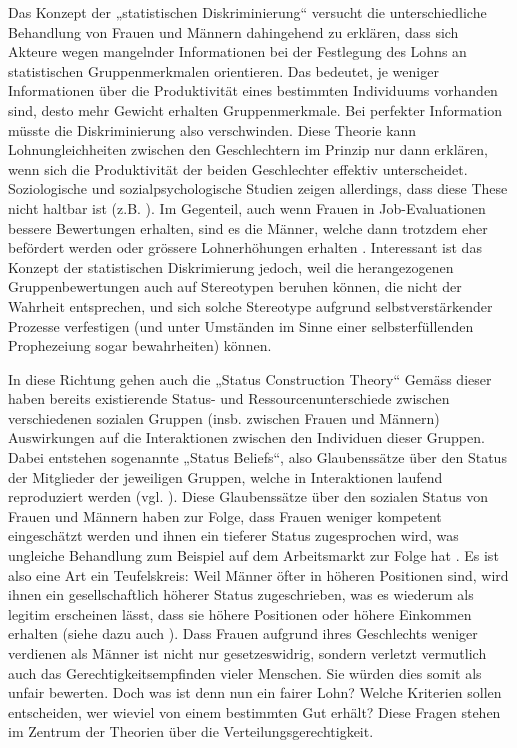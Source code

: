 \documentclass[a4paper,12pt]{article}
\renewcommand{\baselinestretch}{1.1}
\newif\ifcomments
\newcommand{\comment}[1]{%
    \ifcomments\marginpar{\renewcommand{\baselinestretch}{1}\tiny\hspace*{-1.1em}\colorbox{gray!20}%
    {\textcolor{red}{\parbox[t]{.9in}{\raggedright #1}}}}\fi}
\begin{document}
Das Konzept der „statistischen Diskriminierung“ \citep{Arrow-1972,Phelps-1972} versucht
die unterschiedliche Behandlung von Frauen und Männern dahingehend zu erklären,
dass sich Akteure wegen mangelnder Informationen bei der Festlegung des Lohns
an statistischen Gruppenmerkmalen orientieren. Das bedeutet, je weniger Informationen über die Produktivität eines bestimmten Individuums vorhanden sind, desto mehr Gewicht erhalten Gruppenmerkmale. Bei perfekter Information müsste die Diskriminierung also verschwinden. Diese Theorie kann
Lohnungleichheiten zwischen den Geschlechtern im Prinzip nur dann erklären, wenn
sich die Produktivität der beiden Geschlechter effektiv unterscheidet. Soziologische und
sozialpsychologische Studien zeigen allerdings, dass diese These nicht haltbar
ist (z.B. \citealp{Bielby-Bielby-1988}). Im Gegenteil, auch wenn Frauen in
Job-Evaluationen bessere Bewertungen erhalten, sind es die Männer, welche dann
trotzdem eher befördert werden \citep{Blau-DeVaro-2007} oder grössere
Lohnerhöhungen erhalten \citep{Castilla-2012}. Interessant ist das Konzept der 
statistischen Diskrimierung jedoch, weil die herangezogenen Gruppenbewertungen auch auf 
Stereotypen beruhen können, die nicht der Wahrheit 
entsprechen, und sich solche Stereotype aufgrund selbstverstärkender Prozesse 
verfestigen (und unter Umständen im Sinne einer selbsterfüllenden Prophezeiung 
sogar bewahrheiten) können.

In diese Richtung gehen auch die „Status Construction Theory“ \citep{Ridgeway-1997,Ridgeway-2001} Gemäss dieser haben bereits existierende Status- und Ressourcenunterschiede zwischen verschiedenen sozialen Gruppen (insb. zwischen
Frauen und Männern) Auswirkungen auf die Interaktionen zwischen den Individuen
dieser Gruppen. Dabei entstehen sogenannte „Status Beliefs“, also Glaubenssätze
über den Status der Mitglieder der jeweiligen Gruppen, welche in Interaktionen
laufend reproduziert werden (vgl. \citealp{Goffman-1977}). Diese Glaubenssätze
über den sozialen Status von Frauen und Männern haben zur Folge, dass Frauen
weniger kompetent eingeschätzt werden und ihnen ein tieferer Status
zugesprochen wird, was ungleiche Behandlung zum Beispiel auf dem Arbeitsmarkt
zur Folge hat \citep{Ridgeway-1997}. Es ist also eine Art ein Teufelskreis:
Weil Männer öfter in höheren Positionen sind, wird ihnen ein gesellschaftlich
höherer Status zugeschrieben, was es wiederum als legitim erscheinen lässt,
dass sie höhere Positionen oder höhere Einkommen erhalten (siehe dazu auch
\citealp{Berger-etal-1972}).
Dass Frauen aufgrund ihres Geschlechts weniger verdienen als Männer ist nicht nur gesetzeswidrig, sondern verletzt vermutlich auch das Gerechtigkeitsempfinden vieler Menschen. Sie würden dies somit als unfair bewerten. Doch was ist denn nun ein fairer Lohn? Welche Kriterien sollen entscheiden, wer wieviel von einem bestimmten Gut erhält? Diese Fragen stehen im Zentrum der Theorien über die Verteilungsgerechtigkeit.
\comment{Überleitung}
\end{document}
